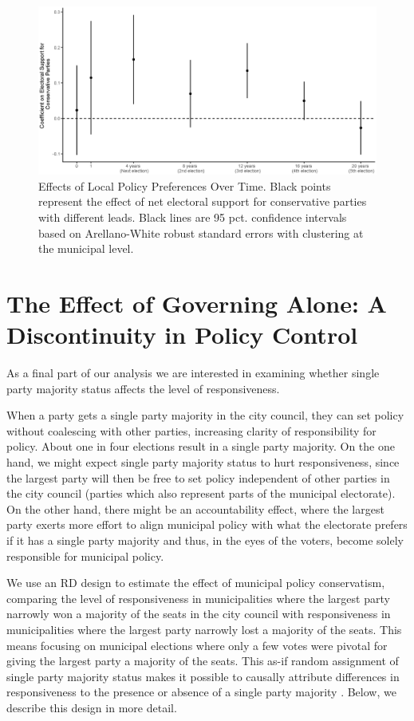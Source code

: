 \documentclass[a4paper,12pt]{article}
\begin{document}
\begin{figure}[h]
	\centering
	\includegraphics[scale = .6]{NoLag_varying_leads.eps}
	\caption{Effects of Local Policy Preferences Over Time. Black points represent the effect of net electoral support for conservative parties with different leads. Black lines are 95 pct. confidence intervals based on Arellano-White robust standard errors with clustering at the municipal level.}
	\label{fig:LongRun}
\end{figure}



\section{The Effect of Governing Alone: A Discontinuity in Policy Control}

As a final part of our analysis we are interested in examining whether single party majority status affects the level of responsiveness. 

When a party gets a single party majority in the city council, they can set policy without coalescing with other parties, increasing clarity of responsibility for policy. About one in four elections result in a single party majority. On the one hand, we might expect single party majority status to hurt responsiveness, since the largest party will then be free to set policy independent of other parties in the city council (parties which also represent parts of the municipal electorate). On the other hand, there might be an accountability effect, where the largest party exerts more effort to align municipal policy with what the electorate prefers if it has a single party majority and thus, in the eyes of the voters, become solely responsible for municipal policy.

We use an RD design to estimate the effect of municipal policy conservatism, comparing the level of responsiveness in municipalities where the largest party narrowly won a majority of the seats in the city council with responsiveness in municipalities where the largest party narrowly lost a majority of the seats. This means focusing on municipal elections where only a few votes were pivotal for giving the largest party a majority of the seats.  This as-if random assignment of single party majority status makes it possible to causally attribute differences in responsiveness to the presence or absence of a single party majority \citep{lee2008randomized,skovron2015practical}. Below, we describe this design in more detail. 
\end{document}
